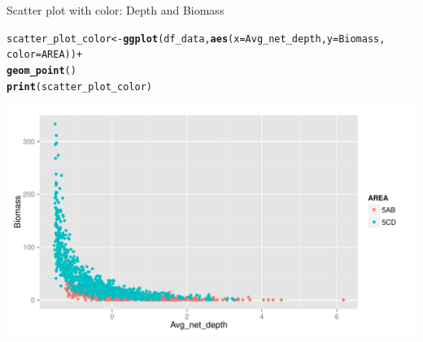 \documentclass{beamer}\usepackage[]{graphicx}\usepackage[]{color}
\makeatletter
\newcommand{\hlopt}[1]{\textcolor[rgb]{0,0,0}{#1}}%
\newcommand{\hlstd}[1]{\textcolor[rgb]{0.345,0.345,0.345}{#1}}%
\newcommand{\hlkwb}[1]{\textcolor[rgb]{0.69,0.353,0.396}{#1}}%
\newcommand{\hlkwc}[1]{\textcolor[rgb]{0.333,0.667,0.333}{#1}}%
\newcommand{\hlkwd}[1]{\textcolor[rgb]{0.737,0.353,0.396}{\textbf{#1}}}%
\newenvironment{kframe}{%
 \def\at@end@of@kframe{}%
 \ifinner\ifhmode%
  \def\at@end@of@kframe{\end{minipage}}%
  \begin{minipage}{\columnwidth}%
 \fi\fi%
 \def\FrameCommand##1{\hskip\@totalleftmargin \hskip-\fboxsep
 \colorbox{shadecolor}{##1}\hskip-\fboxsep
     \hskip-\linewidth \hskip-\@totalleftmargin \hskip\columnwidth}%
 \MakeFramed {\advance\hsize-\width
   \@totalleftmargin\z@ \linewidth\hsize
   \@setminipage}}%
 {\par\unskip\endMakeFramed%
 \at@end@of@kframe}
\newenvironment{knitrout}{}{} %
\makeatother
\begin{document}
\begin{frame}[fragile]{Scatter plot with color: Depth and Biomass}
\begin{knitrout}\footnotesize
{}\color{fgcolor}\begin{kframe}
\begin{alltt}
  \hlstd{scatter_plot_color} \hlkwb{<-} \hlkwd{ggplot}\hlstd{(df_data,} \hlkwd{aes}\hlstd{(}\hlkwc{x}\hlstd{=Avg_net_depth,} \hlkwc{y}\hlstd{=Biomass,}
                                         \hlkwc{color}\hlstd{=AREA))} \hlopt{+}
  \hlkwd{geom_point}\hlstd{()}
  \hlkwd{print}\hlstd{(scatter_plot_color)}
\end{alltt}
\end{kframe}

{\centering \includegraphics[width=.9\linewidth]{figure/scatter_plot_color-1} 

}



\end{knitrout}
\end{frame}
\end{document}
